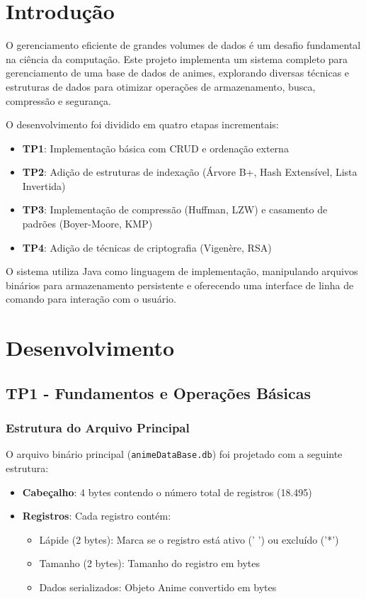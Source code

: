 \documentclass[12pt,a4paper]{article}
\let\oldsection\section
\let\oldsubsection\subsection
\renewcommand{\section}[1]{\needspace{4\baselineskip}\oldsection{#1}}
\renewcommand{\subsection}[1]{\needspace{3\baselineskip}\oldsubsection{#1}}
\begin{document}
\section{Introdução}

O gerenciamento eficiente de grandes volumes de dados é um desafio fundamental na ciência da computação. Este projeto implementa um sistema completo para gerenciamento de uma base de dados de animes, explorando diversas técnicas e estruturas de dados para otimizar operações de armazenamento, busca, compressão e segurança.

O desenvolvimento foi dividido em quatro etapas incrementais:
\begin{itemize}
    \item \textbf{TP1}: Implementação básica com CRUD e ordenação externa
    \item \textbf{TP2}: Adição de estruturas de indexação (Árvore B+, Hash Extensível, Lista Invertida)
    \item \textbf{TP3}: Implementação de compressão (Huffman, LZW) e casamento de padrões (Boyer-Moore, KMP)
    \item \textbf{TP4}: Adição de técnicas de criptografia (Vigenère, RSA)
\end{itemize}

O sistema utiliza Java como linguagem de implementação, manipulando arquivos binários para armazenamento persistente e oferecendo uma interface de linha de comando para interação com o usuário.

\section{Desenvolvimento}
\vspace{1em}
\subsection{TP1 - Fundamentos e Operações Básicas}

\subsubsection{Estrutura do Arquivo Principal}

O arquivo binário principal (\texttt{animeDataBase.db}) foi projetado com a seguinte estrutura:

\begin{itemize}
    \item \textbf{Cabeçalho}: 4 bytes contendo o número total de registros (18.495)
    \item \textbf{Registros}: Cada registro contém:
    \begin{itemize}
        \item Lápide (2 bytes): Marca se o registro está ativo (' ') ou excluído ('*')
        \item Tamanho (2 bytes): Tamanho do registro em bytes
        \item Dados serializados: Objeto Anime convertido em bytes
    \end{itemize}
\end{itemize}
\end{document}
